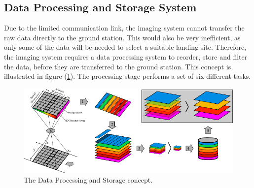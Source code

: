 \subsection{Data Processing and Storage System}
Due to the limited communication link, the imaging system cannot transfer the raw data directly to the ground station. This would also be very inefficient, as only some of the data will be needed to select a suitable landing site. Therefore, the imaging system requires a data processing system to reorder, store and filter the data, before they are transferred to the ground station. This concept is illustrated in figure (\ref{fig:dat_process_concept}). The processing stage performs a set of six different tasks.
\begin{figure}[h!]
\centering
\includegraphics[width=\textwidth]{figures/Orbiter/data_processing_system.pdf}
\caption{The Data Processing and Storage concept.}
\label{fig:dat_process_concept}
\end{figure}
